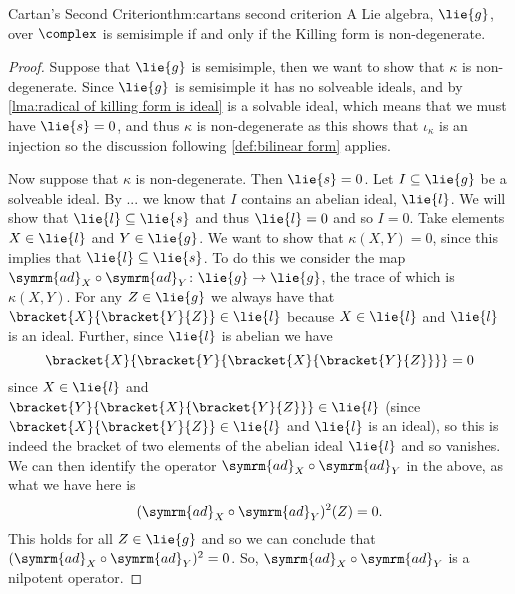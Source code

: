 \documentclass[fleqn]{NotesClass}
\newcommand{\ad}{\symrm{ad}}
\begin{document}
    \begin{thm}{Cartan's Second Criterion}{thm:cartans second criterion}
        A Lie algebra, \(\lie{g}\), over \(\complex\) is semisimple if and only if the Killing form is non-degenerate.
        \begin{proof}
            Suppose that \(\lie{g}\) is semisimple, then we want to show that \(\kappa\) is non-degenerate.
            Since \(\lie{g}\) is semisimple it has no solveable ideals, and by \cref{lma:radical of killing form is ideal} is a solvable ideal, which means that we must have \(\lie{s} = 0\), and thus \(\kappa\) is non-degenerate as this shows that \(\iota_\kappa\) is an injection so the discussion following \cref{def:bilinear form} applies.
            
            Now suppose that \(\kappa\) is non-degenerate.
            Then \(\lie{s} = 0\).
            Let \(I \subseteq \lie{g}\) be a solveable ideal.
            By ... we know that \(I\) contains an abelian ideal, \(\lie{l}\).
            We will show that \(\lie{l} \subseteq \lie{s}\) and thus \(\lie{l} = 0\) and so \(I = 0\).
            Take elements \(X \in \lie{l}\) and \(Y \in \lie{g}\).
            We want to show that \(\kappa(X, Y) = 0\), since this implies that \(\lie{l} \subseteq \lie{s}\).
            To do this we consider the map \(\ad_X \circ \ad_Y \colon \lie{g} \to \lie{g}\), the trace of which is \(\kappa(X, Y)\).
            For any \(Z \in \lie{g}\) we always have that \(\bracket{X}{\bracket{Y}{Z}} \in \lie{l}\) because \(X \in \lie{l}\) and \(\lie{l}\) is an ideal.
            Further, since \(\lie{l}\) is abelian we have
            \begin{equation}
                \bracket{X}{\bracket{Y}{\bracket{X}{\bracket{Y}{Z}}}} = 0
            \end{equation}
            since \(X \in \lie{l}\) and \(\bracket{Y}{\bracket{X}{\bracket{Y}{Z}}} \in \lie{l}\) (since \(\bracket{X}{\bracket{Y}{Z}} \in \lie{l}\) and \(\lie{l}\) is an ideal), so this is indeed the bracket of two elements of the abelian ideal \(\lie{l}\) and so vanishes.
            We can then identify the operator \(\ad_X \circ \ad_Y\) in the above, as what we have here is
            \begin{equation}
                (\ad_X \circ \ad_Y)^2(Z) = 0.
            \end{equation}
            This holds for all \(Z \in \lie{g}\) and so we can conclude that \((\ad_X \circ \ad_Y)^2 = 0\).
            So, \(\ad_X\circ\ad_Y\) is a nilpotent operator.

\end{proof}
\end{thm}
\end{document}
